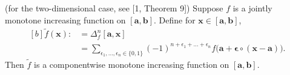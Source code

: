 \documentclass[10pt,a4paper]{amsart}
\begin{document}
\begin{lemma}{(for the two-dimensional case, see [1, Theorem 9])}
    Suppose \(f\) is a jointly monotone increasing function on \([\boldsymbol{a},\boldsymbol{b}]\). Define for \(\boldsymbol{x}\in[\boldsymbol{a},\boldsymbol{b}]\), 
    \begin{equation}
        \begin{aligned}[b]
            \widetilde{f}(\boldsymbol{x})
            :&=\Delta_f^n[\boldsymbol{a},\boldsymbol{x}]\\
            &=\sum_{\epsilon_1,\dots,\epsilon_n\in\{0,1\}}(-1)^{n+\epsilon_1+\dots+\epsilon_n}
            f\big(\boldsymbol{a}+\boldsymbol{\epsilon}\circ(\boldsymbol{x}-\boldsymbol{a})\big). 
        \end{aligned}
    \end{equation}
    Then \(\widetilde{f}\) is a componentwise monotone increasing function on \([\boldsymbol{a},\boldsymbol{b}]\).\\[-0.5em]
\end{lemma}
\end{document}
